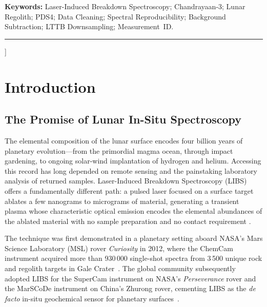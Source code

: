 \documentclass[a4paper,twocolumn,10pt]{article}
\begin{document}
{\begin{@twocolumnfalse}
\begin{abstract}
sub-\SI{500}{\milli\second} response times.  The LTTB algorithm operates
over four distinct zoom levels ($z=0$ to $z=3$), progressively revealing
spectral detail from full-scan overview to raw-resolution feature
inspection, with automatic fallback to raw data when zoom exceeds
instrumental resolution limits.
By establishing a ``single source of scientific truth,'' the system
offers a replicable methodology for Chandrayaan-4, Artemis-era VIPER,
and Commercial Lunar Payload Services (CLPS) LIBS instruments.
\end{abstract}
\vspace{4pt}
\noindent\textbf{Keywords:} Laser-Induced Breakdown Spectroscopy;
Chandrayaan-3; Lunar Regolith; PDS4; Data Cleaning; Spectral
Reproducibility; Background Subtraction; LTTB Downsampling;
Measurement~ID.

\vspace{10pt}\hrule\vspace{12pt}
\end{@twocolumnfalse}
}]


\section{Introduction}
\label{sec:intro}

\subsection{The Promise of Lunar In-Situ Spectroscopy}

The elemental composition of the lunar surface encodes four billion
years of planetary evolution---from the primordial magma ocean, through
impact gardening, to ongoing solar-wind implantation of hydrogen and
helium.  Accessing this record has long depended on remote sensing and
the painstaking laboratory analysis of returned samples.  Laser-Induced
Breakdown Spectroscopy (LIBS) offers a fundamentally different path: a
pulsed laser focused on a surface target ablates a few nanograms to
micrograms of material, generating a transient plasma whose
characteristic optical emission encodes the elemental abundances of the
ablated material with no sample preparation and no contact requirement
\cite{Cremers2006,Wiens2012}.

The technique was first demonstrated in a planetary setting aboard
NASA's Mars Science Laboratory (MSL) rover \emph{Curiosity} in 2012,
where the ChemCam instrument acquired more than 930\,000 single-shot
spectra from 3\,500 unique rock and regolith targets in Gale
Crater~\cite{Wiens2012,Maurice2012,Gasnault2023}.  The global
community subsequently adopted LIBS for the SuperCam instrument on
NASA's \emph{Perseverance} rover and the MarSCoDe instrument on
China's Zhurong rover, cementing LIBS as the \emph{de facto} in-situ
geochemical sensor for planetary surfaces~\cite{Wiens2020,Xu2021}.
\end{document}

